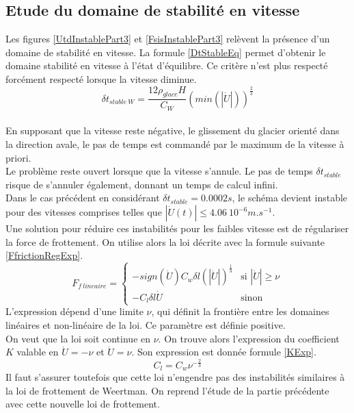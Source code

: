 \documentclass[11pt, a4paper]{article}
\begin{document}
\subsection{Etude du domaine de stabilité en vitesse}

Les figures \ref{UtdInstablePart3} et \ref{FsisInstablePart3} relèvent la présence d'un domaine de stabilité en vitesse. La formule \ref{DtStableEq} permet d'obtenir le domaine stabilité en vitesse à l'état d'équilibre. Ce critère n'est plus respecté forcément respecté lorsque la vitesse diminue. 
\begin{equation}
	\label{DtStableUminEq}
	\delta t_{stable \ W} = \frac{12 \rho_{glace} H}{C_W} \left( min(|\dot{U}|) \right)^{\frac{2}{3}} 
\end{equation}
\\

En supposant que la vitesse reste négative, le glissement du glacier orienté dans la direction avale, le pas de temps est commandé par le maximum de la vitesse à priori.
\\ Le problème reste ouvert lorsque que la vitesse s'annule. Le pas de temps $\delta t_{stable}$ risque de s'annuler également, donnant un temps de calcul infini. 
\\ Dans le cas précédent en considérant $\delta t_{stable} = 0.0002s$, le schéma devient instable pour des vitesses comprises telles que $| \dot{U}(t) | \leq 4.06 \ 10^{-6} m.s^{-1} $.  
\\

Une solution pour réduire ces instabilités pour les faibles vitesse est de régulariser la force de frottement. On utilise alors la loi décrite avec la formule suivante \ref{FfrictionRegExp}.
\begin{equation}
	\label{FfrictionRegExp}
	F_{f \ lineaire} = \left\{ \begin{array}{cl} 
	- sign(\dot{U}) C_w \delta l \left( | \dot{U} | \right)^{\frac{1}{3}} & \text{si } | \dot{U} | \geq \nu \\
	- C_l \delta l \dot{U} & \text{sinon} 
	\end{array} \right .
\end{equation}
L'expression dépend d'une limite $\nu$, qui définit la frontière entre les domaines linéaires et non-linéaire de la loi. Ce paramètre est définie positive. 
\\ On veut que la loi soit continue en $\nu$. On trouve alors l'expression du coefficient $K$ valable en $\dot{U} = - \nu$ et $\dot{U} = \nu$. Son expression est donnée formule \ref{KExp}.
\begin{equation}
	\label{KExp}
	C_l = C_w \nu^{-\frac{2}{3}}
\end{equation}
Il faut s'assurer toutefois que cette loi n'engendre pas des instabilités similaires à la loi de frottement de Weertman. On reprend l'étude de la partie précédente avec cette nouvelle loi de frottement.
\\
\end{document}
